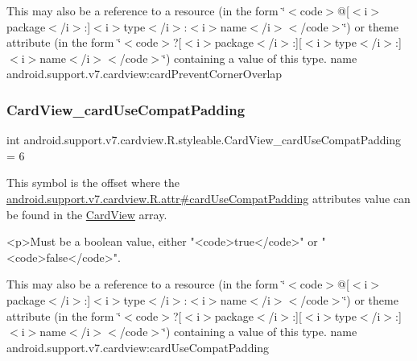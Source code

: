 This may also be a reference to a resource (in the form \char`\"{}$<$code$>$@\mbox{[}$<$i$>$package$<$/i$>$\+:\mbox{]}$<$i$>$type$<$/i$>$\+:$<$i$>$name$<$/i$>$$<$/code$>$\char`\"{}) or theme attribute (in the form \char`\"{}$<$code$>$?\mbox{[}$<$i$>$package$<$/i$>$\+:\mbox{]}\mbox{[}$<$i$>$type$<$/i$>$\+:\mbox{]}$<$i$>$name$<$/i$>$$<$/code$>$\char`\"{}) containing a value of this type.  name android.\+support.\+v7.\+cardview\+:card\+Prevent\+Corner\+Overlap \mbox{\label{classandroid_1_1support_1_1v7_1_1cardview_1_1R_1_1styleable_a32c785b85bf780371d8996ca17967eec}} 
\subsubsection{\texorpdfstring{Card\+View\+\_\+card\+Use\+Compat\+Padding}{CardView\_cardUseCompatPadding}}
{\footnotesize\ttfamily int android.\+support.\+v7.\+cardview.\+R.\+styleable.\+Card\+View\+\_\+card\+Use\+Compat\+Padding = 6\hspace{0.3cm}{\ttfamily [static]}}

This symbol is the offset where the \hyperlink{classandroid_1_1support_1_1v7_1_1cardview_1_1R_1_1attr_a213091aa6628fdf49f3b5c0428bd03de}{android.\+support.\+v7.\+cardview.\+R.\+attr\#card\+Use\+Compat\+Padding} attribute\textquotesingle{}s value can be found in the \hyperlink{classandroid_1_1support_1_1v7_1_1cardview_1_1R_1_1styleable_ad08b98a07471f174f404c58941fc82ca}{Card\+View} array.

\begin{DoxyVerb}      <p>Must be a boolean value, either "<code>true</code>" or "<code>false</code>".
\end{DoxyVerb}
 

This may also be a reference to a resource (in the form \char`\"{}$<$code$>$@\mbox{[}$<$i$>$package$<$/i$>$\+:\mbox{]}$<$i$>$type$<$/i$>$\+:$<$i$>$name$<$/i$>$$<$/code$>$\char`\"{}) or theme attribute (in the form \char`\"{}$<$code$>$?\mbox{[}$<$i$>$package$<$/i$>$\+:\mbox{]}\mbox{[}$<$i$>$type$<$/i$>$\+:\mbox{]}$<$i$>$name$<$/i$>$$<$/code$>$\char`\"{}) containing a value of this type.  name android.\+support.\+v7.\+cardview\+:card\+Use\+Compat\+Padding \mbox{\label{classandroid_1_1support_1_1v7_1_1cardview_1_1R_1_1styleable_ac1c8de17031173bc157d0bd6b488c607}} 
